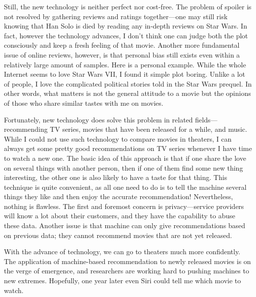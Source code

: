 \documentclass{writing}
\begin{document}
Still, the new technology is neither perfect nor cost-free. The problem
of spoiler is not resolved by gathering reviews and ratings
together---one may still risk knowing that Han Solo is died by reading
any in-depth reviews on Star Wars. In fact, however the technology
advances, I don't think one can judge both the plot consciously and keep
a fresh feeling of that movie. Another more fundamental issue of online
reviews, however, is that personal bias still exists even within a
relatively large amount of samples. Here is a personal example. While
the whole Internet seems to love Star Wars VII, I found it simple plot
boring. Unlike a lot of people, I love the complicated political stories
told in the Star Wars prequel. In other words, what matters is not the
general attitude to a movie but the opinions of those who share similar
tastes with me on movies.

Fortunately, new technology does solve this problem in related
fields---recommending TV series, movies that have been released for a
while, and music. While I could not use such technology to compare
movies in theaters, I can always get some pretty good recommendations on
TV series whenever I have time to watch a new one. The basic idea of
this approach is that if one share the love on several things with
another person, then if one of them find some new thing interesting, the
other one is also likely to have a taste for that thing. This technique
is quite convenient, as all one need to do is to tell the machine
several things they like and then enjoy the accurate recommendation!
Nevertheless, nothing is flawless. The first and foremost concern is
privacy---service providers will know a lot about their customers, and
they have the capability to abuse these data. Another issue is that
machine can only give recommendations based on previous data; they
cannot recommend movies that are not yet released.

With the advance of technology, we can go to theaters much more
confidently. The application of machine-based recommendation to newly
released movies is on the verge of emergence, and researchers are
working hard to pushing machines to new extremes. Hopefully, one year
later even Siri could tell me which movie to watch.
\end{document}

